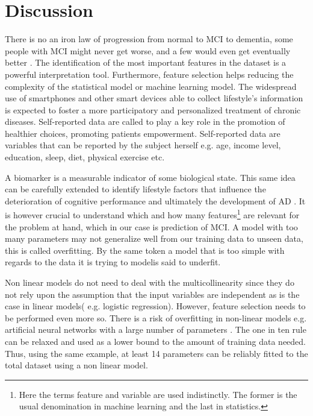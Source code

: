 \documentclass[preprint,12pt]{elsarticle}
\begin{document}
\section{Discussion}
\label{se:dis}
There is no an iron law of progression from normal to MCI to dementia, some people with MCI might never get worse, and a few would even get eventually  better \cite{avila2017subjective}.
The identification of the most important features in the dataset is a powerful interpretation tool. Furthermore, feature selection helps reducing the complexity of the statistical model or machine learning model.
The widespread use of smartphones and other smart devices able to collect lifestyle's information is expected to foster a more participatory and personalized treatment of chronic diseases. Self-reported data are called to play a key role in the promotion of healthier choices, promoting patients empowerment. 
Self-reported data are variables that can be reported by the subject herself e.g. age, income level, education, sleep, diet, physical exercise etc. 

A biomarker is a measurable indicator of some biological state. This same idea can be carefully extended to identify lifestyle factors that influence the deterioration of cognitive performance and ultimately the development of AD \cite{ellis2010addressing}. It is however crucial to understand which and how many features\footnote{Here the terms feature and variable are used indistinctly. The former is the usual denomination in  machine learning and the last in statistics.} are relevant for the problem at hand, which in our case is prediction of MCI. A model with too many parameters may not generalize well from our training data to unseen data, this is called overfitting. By the same token a model that is too simple with regards to the data it is trying to modelis said to underfit.

Non linear models do not need to deal with the multicollinearity since they do not rely upon the assumption that the input variables are independent as is the case in linear models( e.g. logistic regression). However, feature selection needs to be performed even more so. There is a risk of overfitting in non-linear models e.g. artificial neural networks with a large number of parameters \cite{goodfellow2016deep}. The one in ten rule can be relaxed and used as a lower bound to the amount of training data needed. Thus, using the same example, at least 14 parameters can be reliably fitted to the total dataset using a non linear model.
\end{document}
